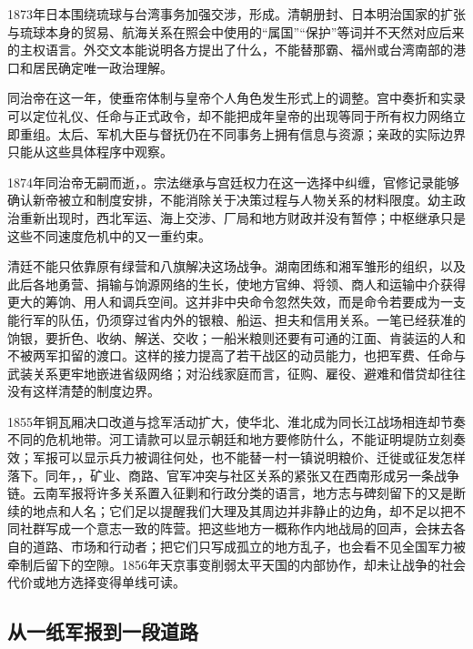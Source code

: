 1873年日本围绕琉球与台湾事务加强交涉，形成。清朝册封、日本明治国家的扩张与琉球本身的贸易、航海关系在照会中使用的“属国”“保护”等词并不天然对应后来的主权语言。外交文本能说明各方提出了什么，不能替那霸、福州或台湾南部的港口和居民确定唯一政治理解。

同治帝在这一年，使垂帘体制与皇帝个人角色发生形式上的调整。宫中奏折和实录可以定位礼仪、任命与正式政令，却不能把成年皇帝的出现等同于所有权力网络立即重组。太后、军机大臣与督抚仍在不同事务上拥有信息与资源；亲政的实际边界只能从这些具体程序中观察。

1874年同治帝无嗣而逝，。宗法继承与宫廷权力在这一选择中纠缠，官修记录能够确认新帝被立和制度安排，不能消除关于决策过程与人物关系的材料限度。幼主政治重新出现时，西北军运、海上交涉、厂局和地方财政并没有暂停；中枢继承只是这些不同速度危机中的又一重约束。

清廷不能只依靠原有绿营和八旗解决这场战争。湖南团练和湘军雏形的组织，以及此后各地勇营、捐输与饷源网络的生长，使地方官绅、将领、商人和运输中介获得更大的筹饷、用人和调兵空间。这并非中央命令忽然失效，而是命令若要成为一支能行军的队伍，仍须穿过省内外的银粮、船运、担夫和信用关系。一笔已经获准的饷银，要折色、收纳、解送、交收；一船米粮则还要有可通的江面、肯装运的人和不被两军扣留的渡口。这样的接力提高了若干战区的动员能力，也把军费、任命与武装关系更牢地嵌进省级网络；对沿线家庭而言，征购、雇役、避难和借贷却往往没有这样清楚的制度边界。

1855年铜瓦厢决口改道与捻军活动扩大，使华北、淮北成为同长江战场相连却节奏不同的危机地带。河工请款可以显示朝廷和地方要修防什么，不能证明堤防立刻奏效；军报可以显示兵力被调往何处，也不能替一村一镇说明粮价、迁徙或征发怎样落下。同年，，矿业、商路、官军冲突与社区关系的紧张又在西南形成另一条战争链。云南军报将许多关系置入征剿和行政分类的语言，地方志与碑刻留下的又是断续的地点和人名；它们足以提醒我们大理及其周边并非静止的边角，却不足以把不同社群写成一个意志一致的阵营。把这些地方一概称作内地战局的回声，会抹去各自的道路、市场和行动者；把它们只写成孤立的地方乱子，也会看不见全国军力被牵制后留下的空隙。1856年天京事变削弱太平天国的内部协作，却未让战争的社会代价或地方选择变得单线可读。

\subsection{从一纸军报到一段道路}

